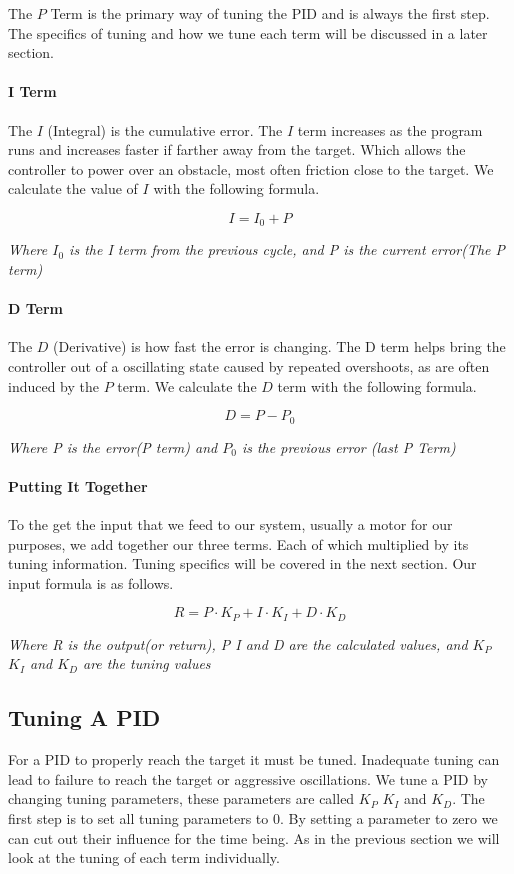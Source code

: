 \documentclass[12pt]{article}
\begin{document}
    The $P$ Term is the primary way of tuning the PID and is always the first step. The specifics of tuning and how we tune each term will be discussed in a later section.

\paragraph{I Term}
    The $I$ (Integral) is the cumulative error. The $I$ term increases as the program runs and increases faster if farther away from the target. Which allows the controller to power over an obstacle, most often friction close to the target. We calculate the value of $I$ with the following formula.

    $$ I = I_0 + P$$
    \begin{center}\em{Where $I_0$ is the I term from the previous cycle, and P is the current error(The P term)}\end{center}

\paragraph{D Term}
    The $D$ (Derivative) is how fast the error is changing. The D term helps bring the controller out of a oscillating state caused by repeated overshoots, as are often induced by the $P$ term. We calculate the $D$ term with the following formula.

    $$D = P - P_0$$
    \begin{center}\em{Where P is the error(P term) and $P_0$ is the previous error (last P Term)}\end{center}

\paragraph{Putting It Together}
    To the get the input that we feed to our system, usually a motor for our purposes, we add together our three terms. Each of which multiplied by its tuning information. Tuning specifics will be covered in the next section. Our input formula is as follows.

    $$ R = P \cdot K_P + I \cdot K_I + D \cdot K_D$$
    \begin{center}
        \em{Where R is the output(or return), P I and D are the calculated values, and $K_P$ $K_I$ and $K_D$ are the tuning values}
    \end{center}

\subsection{Tuning A PID}
    For a PID to properly reach the target it must be tuned. Inadequate tuning can lead to failure to reach the target or aggressive oscillations. We tune a PID by changing tuning parameters, these parameters are called $K_P$ $K_I$ and $K_D$. The first step is to set all tuning parameters to 0. By setting a parameter to zero we can cut out their influence for the time being. As in the previous section we will look at the tuning of each term individually.
\end{document}
